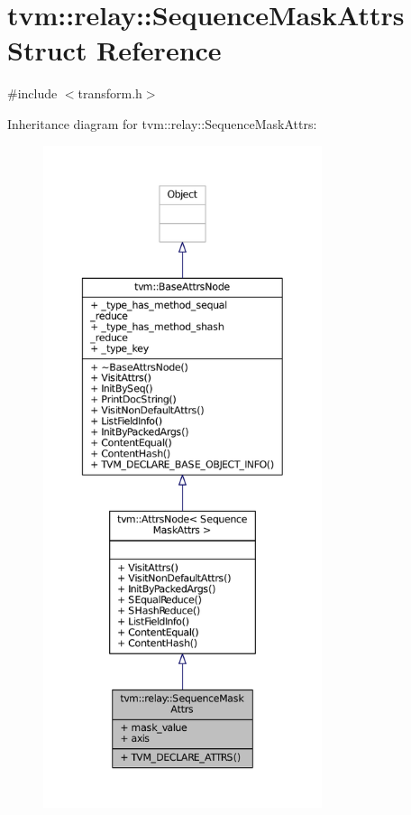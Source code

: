 \hypertarget{structtvm_1_1relay_1_1SequenceMaskAttrs}{}\section{tvm\+:\+:relay\+:\+:Sequence\+Mask\+Attrs Struct Reference}
\label{structtvm_1_1relay_1_1SequenceMaskAttrs}


{\ttfamily \#include $<$transform.\+h$>$}



Inheritance diagram for tvm\+:\+:relay\+:\+:Sequence\+Mask\+Attrs\+:
\nopagebreak
\begin{figure}[H]
\begin{center}
\leavevmode
\includegraphics[height=550pt]{structtvm_1_1relay_1_1SequenceMaskAttrs__inherit__graph}
\end{center}
\end{figure}


